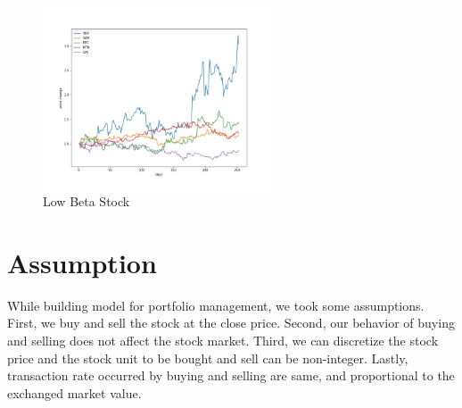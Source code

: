 \begin{figure}[h]
\begin{center}
\includegraphics[clip, width=0.6\textwidth]{Graphics/lowbeta_pricechange.jpg} \caption{Low Beta Stock}
\end{center}
\end{figure}

\section{Assumption}
While building model for portfolio management, we took some assumptions. First, we buy and sell the stock at the close price. Second, our behavior of buying and selling does not affect the stock market. Third, we can discretize the stock price and the stock unit to be bought and sell can be non-integer. Lastly, transaction rate occurred by buying and selling are same, and proportional to the exchanged market value.	
